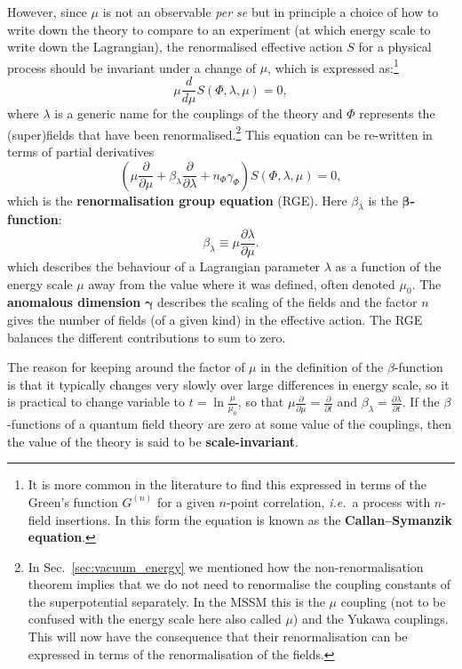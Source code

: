 \documentclass[notes.tex]{subfiles}
\begin{document}
However, since $\mu$ is not an observable {\it per se} but in principle a choice of how to write down the theory to compare to an experiment (at which energy scale to write down the Lagrangian), the renormalised effective action $S$ for a physical process should be invariant under a change of $\mu$, which is expressed as:\footnote{It is more common in the literature to find this expressed in terms of the Green's function $G^{(n)}$ for a given $n$-point correlation, {\it i.e.}\ a process with $n$-field insertions. In this form the equation is known as the {\bf Callan--Symanzik equation}.}
\begin{equation}
\mu \frac{d}{d\mu}S(\Phi, \lambda, \mu) = 0,
\end{equation}
where $\lambda$ is a generic name for the couplings of the theory and $\Phi$ represents the (super)fields that have been renormalised.\footnote{In Sec.~\ref{sec:vacuum_energy} we mentioned how the non-renormalisation theorem implies that we do not need to renormalise the coupling constants of the superpotential separately. In the MSSM this is the $\mu$ coupling (not to be confused with the energy scale here also called $\mu$) and the Yukawa couplings. This will now have the consequence that their renormalisation can be expressed in terms of the renormalisation of the fields.} This equation can be re-written in terms of partial derivatives
\begin{equation}
\left(\mu \frac{\partial}{\partial \mu} + \beta_\lambda\frac{\partial}{\partial\lambda}+n_\Phi\gamma_\Phi\right)S(\Phi, \lambda, \mu)=0,
\end{equation}
which is the {\bf renormalisation group equation} (RGE). Here $\beta_\lambda$ is the {\bf $\boldsymbol \beta$-function}:
\begin{equation}
\beta_\lambda\equiv\mu\frac{\partial \lambda}{\partial \mu}.
\end{equation}
which describes the behaviour of a Lagrangian parameter $\lambda$ as a function of the energy scale $\mu$ away from the value where it was defined, often denoted $\mu_0$. The {\bf anomalous dimension} $\boldsymbol\gamma$ describes the scaling of the fields and the factor $n$ gives the number of fields (of a given kind) in the effective action. The RGE balances the different contributions to sum to zero.

The reason for keeping around the factor of $\mu$ in the definition of the $\beta$-function is that it typically changes very slowly over large differences in energy scale, so it is practical to change variable to $t = \ln\frac{\mu}{\mu_0}$, so that $\mu\frac{\partial}{\partial\mu}=\frac{\partial}{\partial t}$ and $\beta_\lambda = \frac{\partial \lambda}{\partial t}$.
If the $\beta$-functions of a quantum field theory are zero at some value of the couplings, then the value of the theory is said to be {\bf scale-invariant}. 
\end{document}
